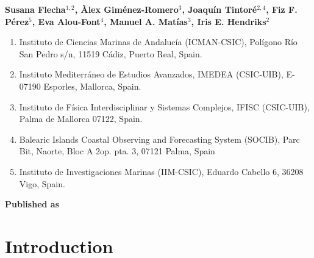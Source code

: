 \vspace{3cm}

\begin{center}
    \textbf{Susana Flecha$^{1,2}$, Àlex Giménez-Romero$^{3}$, Joaquín
        Tintoré$^{2,4}$, Fiz F. Pérez$^{5}$, Eva Alou-Font$^{4}$, Manuel A.
        Matías$^{3}$, Iris E. Hendriks$^{2}$}
\end{center}

\vspace{1cm}

\begin{enumerate}
    \small
    \item Instituto de Ciencias Marinas de Andalucía (ICMAN-CSIC), Polígono Río
          San Pedro s/n, 11519 Cádiz, Puerto Real, Spain.
    \item Instituto Mediterráneo de Estudios Avanzados, IMEDEA (CSIC-UIB),
          E-07190 Esporles, Mallorca, Spain.
    \item Instituto de Física Interdisciplinar y Sistemas Complejos, IFISC
          (CSIC-UIB), Palma de Mallorca 07122, Spain.
    \item Balearic Islands Coastal Observing and Forecasting System (SOCIB),
          Parc Bit, Naorte, Bloc A 2op. pta. 3, 07121 Palma, Spain
    \item Instituto de Investigaciones Marinas (IIM-CSIC), Eduardo Cabello 6,
          36208 Vigo, Spain.
\end{enumerate}

\vspace{1cm}

\textbf{Published as}

\vspace{0.5cm}


\newpage
\section{Introduction}

